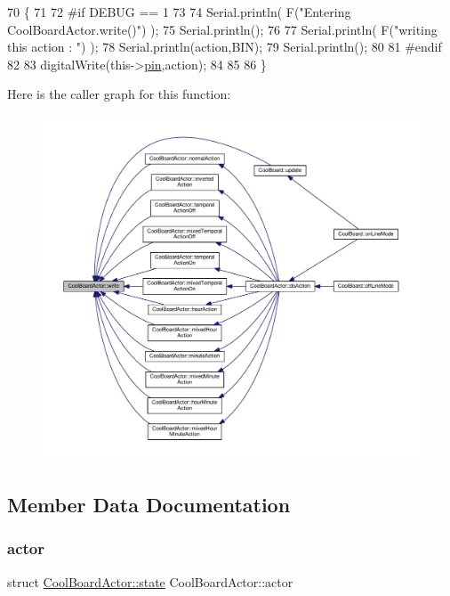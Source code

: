 \begin{DoxyCode}
70 \{
71 
72 \textcolor{preprocessor}{#if DEBUG == 1}
73 
74     Serial.println( F(\textcolor{stringliteral}{"Entering CoolBoardActor.write()"}) );
75     Serial.println();
76 
77     Serial.println( F(\textcolor{stringliteral}{"writing this action : "}) );
78     Serial.println(action,BIN);
79     Serial.println();
80 
81 \textcolor{preprocessor}{#endif }
82     
83     digitalWrite(this->\hyperlink{class_cool_board_actor_a8b5c0b41fe6033b68d9e1ed00bc2e122}{pin},action);
84     
85 
86 \}
\end{DoxyCode}
Here is the caller graph for this function\+:
\nopagebreak
\begin{figure}[H]
\begin{center}
\leavevmode
\includegraphics[width=350pt]{dc/d69/class_cool_board_actor_a958786ff01ea1056ee72c72d439f86da_icgraph}
\end{center}
\end{figure}


\subsection{Member Data Documentation}
\mbox{\label{class_cool_board_actor_a8f190db9f7a39fddbcef7f152da970e9}} 
\subsubsection{\texorpdfstring{actor}{actor}}
{\footnotesize\ttfamily struct \hyperlink{struct_cool_board_actor_1_1state}{Cool\+Board\+Actor\+::state} Cool\+Board\+Actor\+::actor\hspace{0.3cm}{\ttfamily [private]}}

